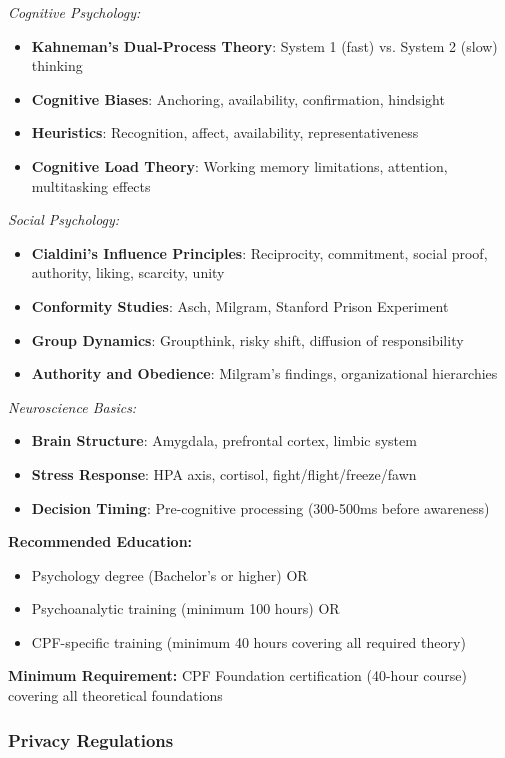 \documentclass[11pt,a4paper]{article}
\begin{document}
\textit{Cognitive Psychology:}
\begin{itemize}
\item \textbf{Kahneman's Dual-Process Theory}: System 1 (fast) vs. System 2 (slow) thinking
\item \textbf{Cognitive Biases}: Anchoring, availability, confirmation, hindsight
\item \textbf{Heuristics}: Recognition, affect, availability, representativeness
\item \textbf{Cognitive Load Theory}: Working memory limitations, attention, multitasking effects
\end{itemize}

\textit{Social Psychology:}
\begin{itemize}
\item \textbf{Cialdini's Influence Principles}: Reciprocity, commitment, social proof, authority, liking, scarcity, unity
\item \textbf{Conformity Studies}: Asch, Milgram, Stanford Prison Experiment
\item \textbf{Group Dynamics}: Groupthink, risky shift, diffusion of responsibility
\item \textbf{Authority and Obedience}: Milgram's findings, organizational hierarchies
\end{itemize}

\textit{Neuroscience Basics:}
\begin{itemize}
\item \textbf{Brain Structure}: Amygdala, prefrontal cortex, limbic system
\item \textbf{Stress Response}: HPA axis, cortisol, fight/flight/freeze/fawn
\item \textbf{Decision Timing}: Pre-cognitive processing (300-500ms before awareness)
\end{itemize}

\textbf{Recommended Education:}
\begin{itemize}
\item Psychology degree (Bachelor's or higher) OR
\item Psychoanalytic training (minimum 100 hours) OR
\item CPF-specific training (minimum 40 hours covering all required theory)
\end{itemize}

\textbf{Minimum Requirement:} CPF Foundation certification (40-hour course) covering all theoretical foundations

\subsubsection{Privacy Regulations}
\end{document}
